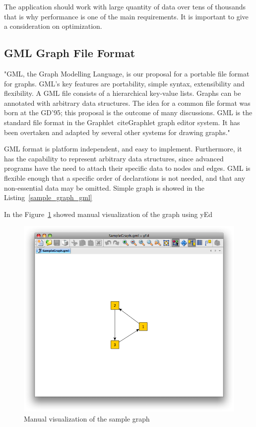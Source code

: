 \documentclass[a4paper,oneside]{article}
\begin{document}
The application should work with large quantity of data over tens of thousands that is why performance is one of the main requirements. It is important to give a consideration on optimization.

\subsection{GML Graph File Format}
 "GML, the Graph Modelling Language, is our proposal for a portable file format for graphs. GML's key features are portability, simple syntax, extensibility and flexibility. A GML file consists of a hierarchical key-value lists. Graphs can be annotated with arbitrary data structures. The idea for a common file format was born at the GD'95; this proposal is the outcome of many discussions. GML is the standard file format in the Graphlet~cite{Graphlet} graph editor system. It has been overtaken and adapted by several other systems for drawing graphs."~\cite{GML}
 
 
GML format is platform independent, and easy to implement. Furthermore, it has the capability to represent arbitrary data structures, since advanced programs have the need to attach their specific data to nodes and edges. GML is flexible enough that a specific order of declarations is not needed, and that any non-essential data may be omitted. Simple graph is showed in the Listing~\ref{sample_graph_gml}

\begin{center}
	
\end{center}

In the Figure~\ref{sample_graph_yed_vis} showed manual visualization of the graph using yEd~\cite{yEd}

\begin{figure}
\begin{center}
	\includegraphics[scale=0.5]{pictures/SampleGraph.png}
	\caption{Manual visualization of the sample graph}
	\label{sample_graph_yed_vis}
\end{center}
\end{figure}
\end{document}
